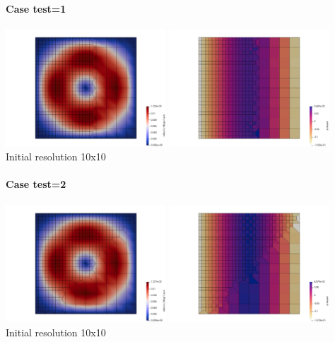 \paragraph{Case test=1}

\begin{center}
\includegraphics[width=6cm]{python_codes/fieldstone_102/results/test1/vel}
\includegraphics[width=6cm]{python_codes/fieldstone_102/results/test1/press}\\
{\captionfont Initial resolution 10x10}
\end{center}

\paragraph{Case test=2}

\begin{center}
\includegraphics[width=6cm]{python_codes/fieldstone_102/results/test2/vel}
\includegraphics[width=6cm]{python_codes/fieldstone_102/results/test2/press}\\
{\captionfont Initial resolution 10x10}
\end{center}


